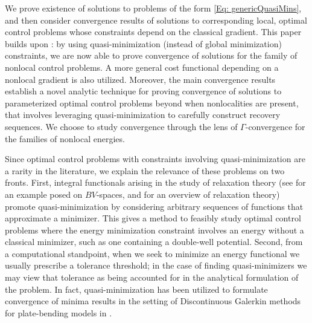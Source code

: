 \documentclass[11pt, reqno]{amsart}   	%
\theoremstyle{plain}
\numberwithin{equation}{section}
\def\Ga{\Gamma}
\begin{document}
We prove existence of solutions to problems of the form \eqref{Eq: genericQuasiMins}, and then consider convergence results of solutions to corresponding local, optimal control problems whose constraints depend on the classical gradient. This paper builds upon \cite{cueto2026localization}: by using quasi-minimization (instead of global minimization) constraints, we are now able to prove convergence of solutions for the family of nonlocal control problems. A more general cost functional depending on a nonlocal gradient is also utilized. Moreover, the main convergence results establish a novel analytic technique for proving convergence of solutions to parameterized optimal control problems beyond when nonlocalities are present, that involves leveraging quasi-minimization to carefully construct recovery sequences. We choose to study convergence through the lens of $\Ga$-convergence for the families of nonlocal energies.

 Since optimal control problems with constraints involving quasi-minimization are a rarity in the literature, we explain the relevance of these problems on two fronts. First, integral functionals arising in the study of relaxation theory (see  \cite[Theorem 2.16]{fonseca1993relaxation} for an example posed on $BV$-spaces, and \cite{buttazzo1982gamma, dal2012introduction, Rin} for an overview of relaxation theory) promote quasi-minimization by considering arbitrary sequences of functions that approximate a minimizer. This gives a method to feasibly study optimal control problems where the energy minimization constraint involves an energy without a classical minimizer, such as one containing a double-well potential. Second, from a computational standpoint, when we seek to minimize an energy functional we usually prescribe a tolerance threshold; in the case of finding quasi-minimizers we may view that tolerance as being accounted for in the analytical formulation of the problem. In fact, quasi-minimization has been utilized to formulate convergence of minima results in the setting of Discontinuous Galerkin methods for plate-bending models in \cite{bonito2023numerical, bonito2021dg}.
\end{document}
